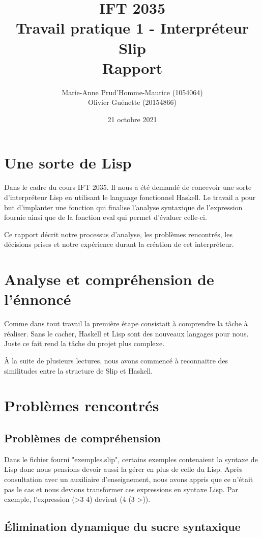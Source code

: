 \documentclass[12pt, letterpaper]{article}
\title{IFT 2035 \\ Travail pratique 1 - Interpréteur Slip \\ Rapport }
\author{ Marie-Anne Prud'Homme-Maurice (1054064) 
\\ Olivier Guénette (20154866)}
\date{21 octobre 2021}
\begin{document}
\maketitle

\section*{Une sorte de Lisp}

Dans le cadre du cours IFT 2035. Il nous a été demandé de concevoir une sorte
d'interpréteur Lisp en utilisant le language fonctionnel Haskell. Le travail
a pour but d'implanter une fonction qui finalise l'analyse syntaxique de
l'expression fournie ainsi que de la fonction eval qui permet d'évaluer
celle-ci.

Ce rapport décrit notre processus d'analyse, les problèmes rencontrés,
les décisions prises et notre expérience durant la création de
cet interpréteur.

\section*{Analyse et compréhension de l'énnoncé}

Comme dans tout travail la première étape consistait à comprendre la tâche à
réaliser.  Sans le cacher, Haskell et Lisp sont des nouveaux langages pour nous.
Juste ce fait rend la tâche du projet plus complexe.

À la suite de plusieurs lectures, nous avons commencé à reconnaitre des 
similitudes entre la structure de Slip et Haskell.

\section*{Problèmes rencontrés}

\subsection*{Problèmes de compréhension}

Dans le fichier fourni "exemples.slip", certains exemples contenaient la 
syntaxe de Lisp donc nous pensions devoir aussi la gérer en plus de celle 
du Lisp. Après consultation avec un auxiliaire d'enseignement, nous avons 
appris que ce n'était pas le cas et nous devions transformer ces 
expressions en syntaxe Lisp. Par exemple, l'expression (\textgreater 3 4) 
devient (4 (3 \textgreater)).

\subsection*{Élimination dynamique du sucre syntaxique}
\end{document}
